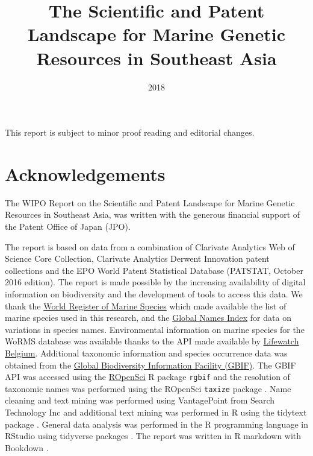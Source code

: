 \documentclass[]{book}
\title{The Scientific and Patent Landscape for Marine Genetic Resources in
Southeast Asia}
\author{}
\date{2018}
\theoremstyle{definition}
\theoremstyle{definition}
\theoremstyle{definition}
\theoremstyle{remark}
\begin{document}
\maketitle

{
\setcounter{tocdepth}{2}
\tableofcontents
}
\hypertarget{section}{%
\chapter*{}\label{section}}

This report is subject to minor proof reading and editorial changes.

\hypertarget{acknowledgements}{%
\chapter*{Acknowledgements}\label{acknowledgements}}

The WIPO Report on the Scientific and Patent Landscape for Marine
Genetic Resources in Southeast Asia, was written with the generous
financial support of the Patent Office of Japan (JPO).

The report is based on data from a combination of Clarivate Analytics
Web of Science Core Collection, Clarivate Analytics Derwent Innovation
patent collections and the EPO World Patent Statistical Database
(PATSTAT, October 2016 edition). The report is made possible by the
increasing availability of digital information on biodiversity and the
development of tools to access this data. We thank the
\href{http://www.marinespecies.org/}{World Register of Marine Species}
which made available the list of marine species used in this research,
and the \href{http://gni.globalnames.org/}{Global Names Index} for data
on variations in species names. Environmental information on marine
species for the WoRMS database was available thanks to the API made
available by
\href{http://www.lifewatch.be/data-services/?cache=1521050271}{Lifewatch
Belgium}. Additional taxonomic information and species occurrence data
was obtained from the \href{https://www.gbif.org/}{Global Biodiversity
Information Facility (GBIF)}. The GBIF API was accessed using the
\href{https://ropensci.org/}{ROpenSci} R package \texttt{rgbif} and the
resolution of taxonomic names was performed using the ROpenSci
\texttt{taxize} package \citep{R-rgbif, R-taxize}. Name cleaning and
text mining was performed using VantagePoint from Search Technology Inc
and additional text mining was performed in R using the tidytext package
\citep{R-tidytext}. General data analysis was performed in the R
programming language in RStudio using tidyverse packages
\citep{R-base, R-tidyverse}. The report was written in R markdown with
Bookdown \citep{R-rmarkdown, R-bookdown}.
\end{document}

